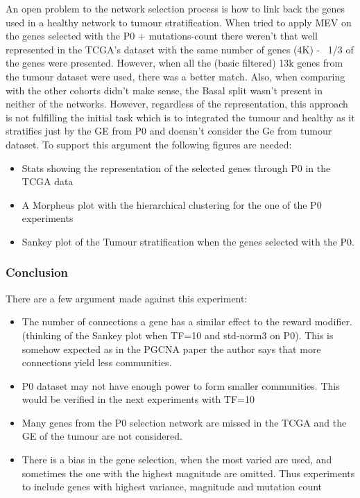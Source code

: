An open problem to the network selection process is how to link back the genes used in a healthy network to tumour stratification. When tried to apply MEV on the genes selected with the P0 + mutations-count there weren't that well represented in the TCGA's dataset with the same number of genes (4K) - ~1/3 of the genes were presented. However, when all the (basic filtered) 13k genes from the tumour dataset were used, there was a better match. Also, when comparing with the other cohorts didn't make sense, the Basal split wasn't present in neither of the networks. However, regardless of the representation, this approach is not fulfilling the initial task which is to integrated the tumour and healthy as it stratifies just by the GE from P0 and doensn't consider the Ge from tumour dataset.
To support this argument the following figures are needed:
\begin{itemize}
    \item Stats showing the representation of the selected genes through P0 in the TCGA data
    \item A Morpheus plot with the hierarchical clustering for the one of the P0 experiments
    \item Sankey plot of the Tumour stratification when the genes selected with the P0.
\end{itemize}


\subsubsection{Conclusion}

There are a few argument made against this experiment:
\begin{itemize}
    \item The number of connections a gene has a similar effect to the reward modifier. (thinking of the Sankey plot when TF=10 and std-norm3 on P0). This is somehow expected as in the PGCNA paper the author says that more connections yield less communities.
    \item P0 dataset may not have enough power to form smaller communities. This would be verified in the next experiments with TF=10
    \item Many genes from the P0 selection network are missed in the TCGA and the GE of the tumour are not considered.
    \item There is a bias in the gene selection, when the most varied are used, and sometimes the one with the highest magnitude are omitted. Thus experiments to include genes with highest variance, magnitude and mutation count
\end{itemize}